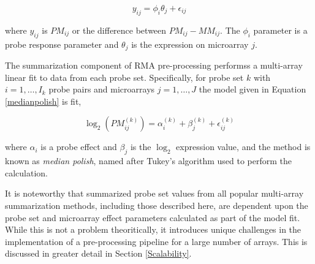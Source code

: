 \begin{equation}
\label{mbeisummary}
y_{ij} = \phi_i \theta_j + \epsilon_{ij}
\end{equation}

where $y_{ij}$ is $PM_{ij}$ or the difference between $PM_{ij}-MM_{ij}$. The
$\phi_i$ parameter is a probe response parameter and $\theta_j$ is the
expression on microarray $j$.

The summarization component of RMA pre-processing \cite{rma} performss a
multi-array linear fit to data from each probe set.  Specifically, for probe
set $k$ with $i=1,\dots,I_k$ probe pairs and microarrays $j=1,\dots,J$ the
model given in Equation \ref{medianpolish} is fit,

\begin{equation}
\label{medianpolish}
\log_2\left(PM^{(k)}_{ij}\right) = \alpha_i^{(k)} + \beta_j^{(k)} + \epsilon_{ij}^{(k)}
\end{equation}

where $\alpha_i$ is a probe effect and $\beta_j$ is the $\log_2$ expression
value, and the method is known as \emph{median polish}, named after Tukey's
algorithm used to perform the calculation.

It is noteworthy that summarized probe set values from all popular multi-array
summarization methods, including those described here, are dependent upon the
probe set and microarray effect parameters calculated as part of the model fit.
While this is not a problem theoritically, it introduces unique challenges in
the implementation of a pre-processing pipeline for a large number of arrays.
This is discussed in greater detail in Section \ref{Scalability}.

